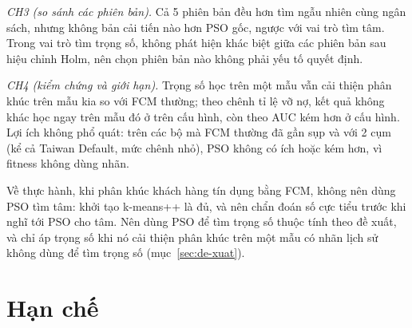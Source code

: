 \emph{CH3 (so sánh các phiên bản).} Cả 5 phiên bản đều hơn tìm ngẫu nhiên cùng ngân sách, nhưng không bản cải tiến nào hơn
PSO gốc, ngược với vai trò tìm tâm. Trong vai trò tìm trọng số, không phát hiện khác biệt giữa các phiên bản sau hiệu chỉnh Holm, nên
chọn phiên bản nào không phải yếu tố quyết định.

\emph{CH4 (kiểm chứng và giới hạn).} Trọng số học trên một mẫu vẫn cải thiện phân khúc trên mẫu kia so với FCM thường; theo chênh tỉ lệ
vỡ nợ, kết quả không khác học ngay trên mẫu đó ở \soLieuEMuoiChenhTiLePsoTaiChoBang{} trên \soLieuEMuoiSoCauHinh{} cấu hình, còn theo AUC
kém hơn ở \soLieuEMuoiAucCungPsoTaiChoKem{} cấu hình. Lợi ích không phổ quát: trên các bộ mà FCM thường đã gần sụp và với 2 cụm (kể cả Taiwan Default, mức chênh
nhỏ), PSO không có ích hoặc kém hơn, vì fitness không dùng nhãn.

Về thực hành, khi phân khúc khách hàng tín dụng bằng FCM, không nên dùng PSO tìm tâm: khởi tạo k-means++ là đủ, và nên chẩn
đoán số cực tiểu trước khi nghĩ tới PSO cho tâm. Nên dùng PSO để tìm trọng số thuộc tính theo đề xuất, và chỉ áp trọng số
khi nó cải thiện phân khúc trên một mẫu có nhãn lịch sử không dùng để tìm trọng số (mục~\ref{sec:de-xuat}).

\section*{Hạn chế}

